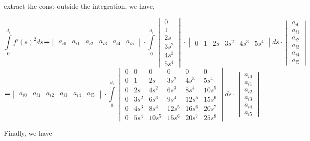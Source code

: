 \documentclass[a4paper,11pt]{article}  %
\begin{document}
extract the const outside the integration, we have,

$$
\int\limits_{0}^{d_i} f'(s)^2 ds ＝
\begin{vmatrix} a_{i0} & a_{i1} & a_{i2} & a_{i3} & a_{i4} & a_{i5} \end{vmatrix} 
\cdot 
\int\limits_{0}^{d_i}  
\begin{vmatrix} 0 \\ 1 \\ 2s \\ 3s^2 \\ 4s^3 \\ 5s^4 \end{vmatrix} 
\cdot 
\begin{vmatrix} 0 & 1 & 2s & 3s^2 & 4s^3 & 5s^4 \end{vmatrix} ds 
\cdot 
\begin{vmatrix} a_{i0} \\ a_{i1} \\ a_{i2} \\ a_{i3} \\ a_{i4} \\ a_{i5}  \end{vmatrix}
$$
$$
＝\begin{vmatrix} a_{i0} & a_{i1} & a_{i2} & a_{i3} & a_{i4} & a_{i5} \end{vmatrix} 
\cdot \int\limits_{0}^{d_i}
\begin{vmatrix} 
0  & 0 &0&0&0&0\\ 
0 & 1 & 2s & 3s^2 & 4s^3 & 5s^4\\
0 & 2s & 4s^2 & 6s^3 & 8s^4 & 10s^5\\
0 & 3s^2 &  6s^3 & 9s^4 & 12s^5&15s^6 \\
0 & 4s^3 & 8s^4 &12s^5 &16s^6&20s^7 \\
0 & 5s^4 & 10s^5 & 15s^6 & 20s^7 & 25s^8 
\end{vmatrix} ds 
\cdot 
\begin{vmatrix} a_{i0} \\ a_{i1} \\ a_{i2} \\ a_{i3} \\ a_{i4} \\ a_{i5} \end{vmatrix}
$$


Finally, we have
\end{document}
